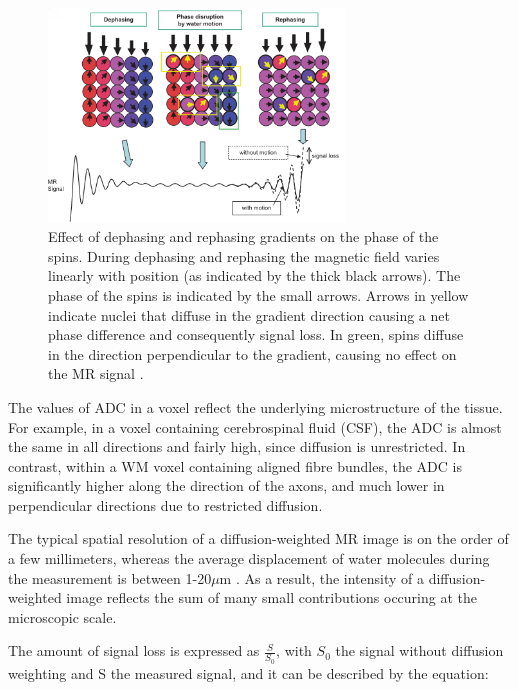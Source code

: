 \begin{figure}[h]
  \centering
  \includegraphics[width=0.7\textwidth]{Images/diffusion_2.png} %
  \caption{Effect of dephasing and rephasing gradients on the phase of the spins. During dephasing and rephasing the magnetic field varies linearly with position (as indicated by the thick black arrows). The phase of the spins is indicated by the small arrows. Arrows in yellow indicate nuclei that diffuse in the gradient direction causing a net phase difference and consequently signal loss. In green, spins diffuse in the direction perpendicular to the gradient, causing no effect on the MR signal \cite{Mori20141}.}
  \label{fig:diffusion2}
\end{figure}



The values of ADC in a voxel reflect the underlying microstructure of the tissue. For example, in a voxel containing cerebrospinal fluid (CSF), the ADC is almost the same in all directions and fairly high, since diffusion is unrestricted. In contrast, within a WM voxel containing aligned fibre bundles, the ADC is significantly higher along the direction of the axons, and much lower in perpendicular directions due to restricted diffusion.

The typical spatial resolution of a diffusion-weighted MR image is on the order of a few millimeters, whereas the average displacement of water molecules during the measurement is between 1-20$\mu$m \cite{Mori20141}. As a result, the intensity of a diffusion-weighted image reflects the sum of many small contributions occuring at the microscopic scale.


The amount of signal loss is expressed as $\frac{S}{S_0}$, with $S_0$ the signal without diffusion weighting and S the measured signal, and it can be described by the equation:

